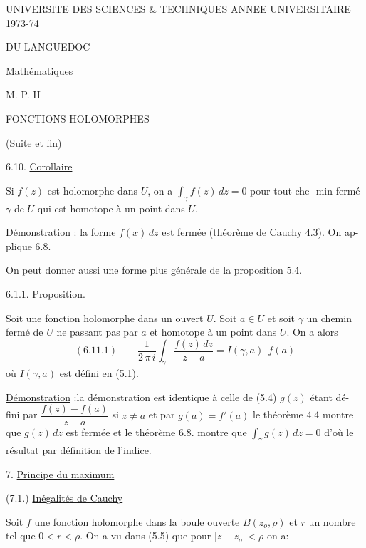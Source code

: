 UNIVERSITE DES SCIENCES \& TECHNIQUES \qquad ANNEE UNIVERSITAIRE 1973-74

DU LANGUEDOC

Mathématiques

M. P. II

FONCTIONS HOLOMORPHES

\uline{(Suite et fin)}

6.10. \uline{Corollaire}

Si $f(z)$ est holomorphe dans $U$, on a $\int_{\gamma} f(z)\,dz = 0$ pour tout che-%
min fermé $\gamma$ de $U$ qui est homotope à un point dans $U$.

\uline{Démonstration} : la forme $f(x)\,dz$ est fermée (théorème de Cauchy 4.3). On ap-%
plique 6.8.

On peut donner aussi une forme plus générale de la proposition 5.4.

6.1.1. \uline{Proposition}.

Soit  une fonction holomorphe dans un ouvert $U$. Soit $a \in U$ et
soit $\gamma$ un chemin fermé de $U$ ne passant pas par $a$ et homotope à un point
dans $U$. On a alors
\[ (6.11.1) \qquad \frac{1}{2\,\pi\, i}\int_{\gamma} \frac{f(z)\,dz}{z-a} = I(\gamma,a)\ \ f(a) \]
où $I(\gamma,a)$ est défini en (5.1).

\uline{Démonstration} :la démonstration est identique à celle de (5.4) $g(z)$ étant dé-%
fini par $\dfrac{f(z) - f(a)}{z-a}$ si $z \neq a$ et par $g(a) = f'(a)$ le théorème 4.4 montre
que $g(z)\,dz$ est fermée et le théorème 6.8. montre que $\int_{\gamma} g(z)\,dz = 0$ d'où
le résultat par définition de l'indice.

7. \uline{Principe du maximum}

(7.1.) \uline{Inégalités de Cauchy}

Soit $f$ une fonction holomorphe dans la boule ouverte $B(z_o,\rho)$ et
$r$ un nombre tel que $0 < r < \rho$. On a vu dans (5.5) que pour $|z - z_o| < \rho$ on
a:

